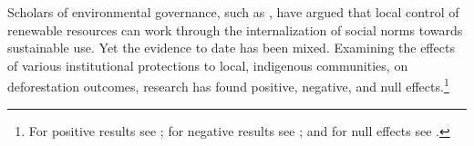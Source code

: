 \documentclass[12pt,reqno]{article}
\newcommand{\citep}[1]{\parencite{#1}}
\begin{document}
Scholars of environmental governance, such as \textcite{sethi1996evolution, dasgupta1995inquiry, agrawal1999enchantment,Dietz2003-bs,Lemos2006-tq}, have argued that local control of renewable resources can work through the internalization of social norms towards sustainable use. Yet the evidence to date has been mixed. Examining the effects of various institutional protections to local, indigenous communities, on deforestation outcomes, research has found positive, negative, and null effects.\footnote{For positive results see \textcite{baragwanath2020collective,nolte2013governance,nepstad2006inhibition,robinson2014does,bonilla2019protected,blackman2017titling,agrawal2014governing}; for negative results see \textcite{robinson2014does, benyishay2017indigenous, buntaine2015titling}; and for null effects see \textcite{Christinsen2020}.}





\end{document}

